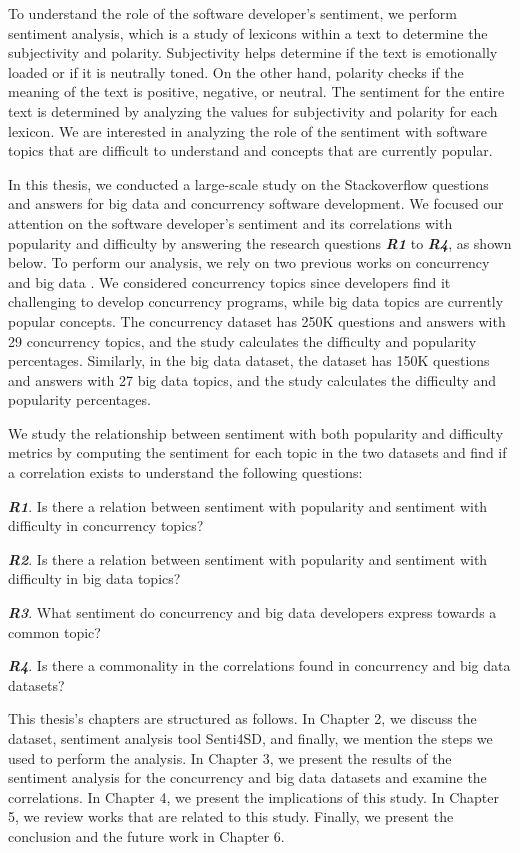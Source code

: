 To understand the role of the software developer's sentiment, we perform sentiment analysis, which is a study of lexicons within a text to determine the subjectivity and polarity. Subjectivity helps determine if the text is emotionally loaded or if it is neutrally toned. On the other hand, polarity checks if the meaning of the text is positive, negative, or neutral. The sentiment for the entire text is determined by analyzing the values for subjectivity and polarity for each lexicon. We are interested in analyzing the role of the sentiment with software topics that are difficult to understand and concepts that are currently popular. 

In this thesis, we conducted a large-scale study on the Stackoverflow questions and answers for big data and concurrency software development. We focused our attention on the software developer's sentiment and its correlations with popularity and difficulty by answering the research questions \emph{\textbf{R1}} to \emph{\textbf{R4}}, as shown below. To perform our analysis, we rely on two previous works on concurrency and big data \cite{ahmed2018concurrency, bagherzadeh2019going}. We considered concurrency topics since developers find it challenging to develop concurrency programs, while big data topics are currently popular concepts. The concurrency dataset \cite{ahmed2018concurrency} has 250K questions and answers with 29 concurrency topics, and the study calculates the difficulty and popularity percentages. Similarly, in the big data dataset, the dataset has 150K questions and answers with 27 big data topics, and the study calculates the difficulty and popularity percentages. 

We study the relationship between sentiment with both popularity and difficulty metrics by computing the sentiment for each topic in the two datasets and find if a correlation exists to understand the following questions:

\emph{\textbf{R1}}. Is there a relation between sentiment with popularity and sentiment with difficulty in concurrency topics?

\emph{\textbf{R2}}. Is there a relation between sentiment with popularity and sentiment with difficulty in big data topics?

\emph{\textbf{R3}}. What sentiment do concurrency and big data developers express towards a common topic?

\emph{\textbf{R4}}. Is there a commonality in the correlations found in concurrency and big data datasets?
 
This thesis's chapters are structured as follows. In Chapter 2, we discuss the dataset, sentiment analysis tool Senti4SD, and finally, we mention the steps we used to perform the analysis. In Chapter 3, we present the results of the sentiment analysis for the concurrency and big data datasets and examine the correlations. In Chapter 4, we present the implications of this study. In Chapter 5, we review works that are related to this study. Finally, we present the conclusion and the future work in Chapter 6.
